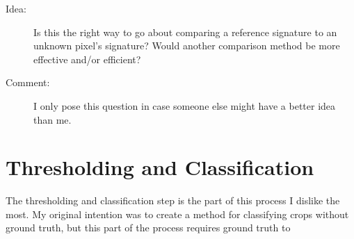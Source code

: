 \begin{description}
\item[Idea:] Is this the right way to go about comparing a reference signature to an unknown pixel’s signature? Would another comparison method be more effective and/or efficient?

\item[Comment:] I only pose this question in case someone else might have a better idea than me. %
\end{description}

\section{Thresholding and Classification}

The thresholding and classification step is the part of this process I dislike the most. My original intention was to create a method for classifying crops without ground truth, but this part of the process requires ground truth to 

